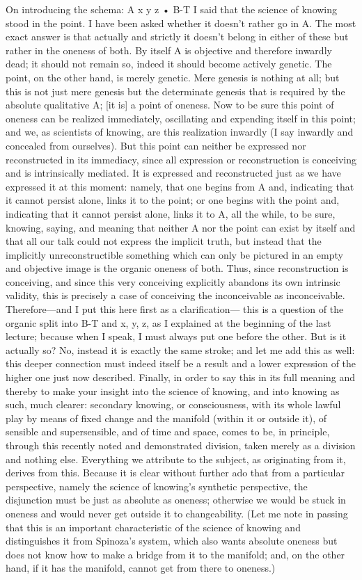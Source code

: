 On introducing the schema:
A
x y z • B-T
I said that the science of knowing stood in the point.
I have been asked whether it doesn't rather go in A.
The most exact answer is that actually and strictly
it doesn't belong in either of these
but rather in the oneness of both.
By itself A is objective and therefore inwardly dead;
it should not remain so, indeed it should become actively genetic.
The point, on the other hand, is merely genetic.
Mere genesis is nothing at all; but this is not just
mere genesis but the determinate genesis that is required by
the absolute qualitative A; [it is] a point of oneness.
Now to be sure this point of oneness can be realized immediately,
oscillating and expending itself in this point;
and we, as scientists of knowing, are this realization inwardly
(I say inwardly and concealed from ourselves).
But this point can neither be expressed nor reconstructed
in its immediacy, since all expression or reconstruction is
conceiving and is intrinsically mediated.
It is expressed and reconstructed just as we have expressed it
at this moment: namely, that one begins from A and,
indicating that it cannot persist alone,
links it to the point;
or one begins with the point and,
indicating that it cannot persist alone,
links it to A, all the while, to be sure,
knowing, saying, and meaning that
neither A nor the point can exist by itself and
that all our talk could not express the implicit truth,
but instead that the implicitly unreconstructible something
which can only be pictured in an empty and objective image is
the organic oneness of both.
Thus, since reconstruction is conceiving, and
since this very conceiving explicitly abandons its own intrinsic validity,
this is precisely a case of conceiving the inconceivable as inconceivable.
Therefore—and I put this here first as a clarification—
this is a question of the organic split into
B-T and x, y, z, as I explained at the beginning of the last lecture;
because when I speak, I must always put one before the other.
But is it actually so?
No, instead it is exactly the same stroke;
and let me add this as well:
this deeper connection must indeed itself be a result and
a lower expression of the higher one just now described.
Finally, in order to say this in its full meaning
and thereby to make your insight into the science of knowing,
and into knowing as such, much clearer:
secondary knowing, or consciousness, with its whole lawful play
by means of fixed change and the manifold
(within it or outside it),
of sensible and supersensible,
and of time and space, comes to be, in principle,
through this recently noted and demonstrated division,
taken merely as a division and nothing else.
Everything we attribute to the subject, as originating from it,
derives from this.
Because it is clear without further ado that from a particular perspective,
namely the science of knowing's synthetic perspective,
the disjunction must be just as absolute as oneness;
otherwise we would be stuck in oneness
and would never get outside it to changeability.
(Let me note in passing that this is
an important characteristic of the science of knowing
and distinguishes it from Spinoza's system,
which also wants absolute oneness
but does not know how to make a bridge from it to the manifold;
and, on the other hand, if it has the manifold,
cannot get from there to oneness.)


